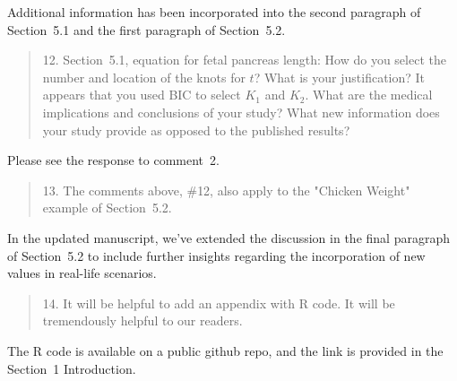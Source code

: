 \documentclass[12pt]{article}
\newenvironment{comment}%
{\begin{quotation}\noindent\small\it\ignorespaces%
  }{\end{quotation}}
\begin{document}
Additional information has been incorporated into the second paragraph
of Section~5.1 and the first paragraph of Section~5.2.

\begin{comment}
  12. Section~5.1, equation for fetal pancreas length: How do you
  select the number and location of the knots for $t$? What is your
  justification? It appears that you used BIC to select $K_1$ and
  $K_2$. What are the medical implications and conclusions of your
  study? What new information does your study provide as opposed to
  the published results?
\end{comment}

Please see the response to comment~2.

 
\begin{comment}
  13. The comments above, $\#$12, also apply to the "Chicken Weight"
  example of Section~5.2.
\end{comment}

In the updated manuscript, we've extended the discussion in the final
paragraph of Section~5.2 to include further insights regarding the
incorporation of new values in real-life scenarios.


\begin{comment}
  14. It will be helpful to add an appendix with R code. It will be
  tremendously helpful to our readers. 
\end{comment}

The R code is available on a public github repo, and the link is
provided in the Section~1 Introduction. 







\end{document}
